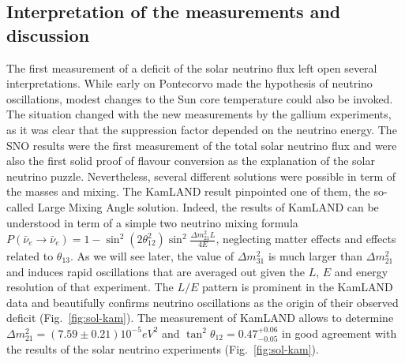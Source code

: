 \subsection{Interpretation of the measurements and discussion}
\label{subsec:solarinter}

The first measurement of a deficit of the solar neutrino flux left open several interpretations. While early on Pontecorvo made the hypothesis of neutrino oscillations\cite{pontecorvo67}, modest changes to the Sun core temperature could also be invoked. 
The situation changed with the new measurements by the gallium experiments, as it was clear that the suppression factor depended on the neutrino energy. The SNO results were the first measurement of the total solar neutrino flux and were also the first solid proof of flavour conversion as the explanation of the solar neutrino puzzle. 
Nevertheless, several different solutions were possible in term of the masses and mixing. The KamLAND result pinpointed one of them, the so-called Large Mixing Angle solution. Indeed, the results of KamLAND can be understood in term of a simple two neutrino mixing formula $ P(\bar{\nu}_e \rightarrow \bar{\nu}_e ) = 1 - \sin^2 (2 \theta_{12}^2) \sin^2 \frac{\Delta m^2_{21} L}{4 E} $, neglecting matter effects and effects related to $\theta_{13}$. As we will see later, the value of $\Delta m^2_{31}$ is much larger than $\Delta m^2_{21}$ and induces rapid oscillations that are averaged out given the $L$, $E$ and energy resolution of that experiment. The $L/E$ pattern is prominent in the KamLAND data and beautifully confirms neutrino oscillations as the origin of their observed deficit (Fig.~\ref{fig:sol-kam}). The measurement of KamLAND allows to determine $\Delta m^2_{21} = (7.59 \pm 0.21) 10^{-5}
eV^2$ and $\tan^2 \theta_{12} = 0.47 ^{+0.06} _{-0.05} $ in good agreement with the results of the solar neutrino experiments (Fig.~\ref{fig:sol-kam}).

